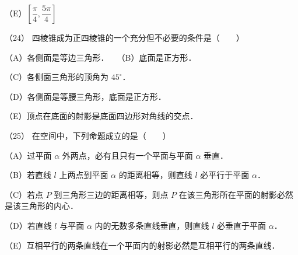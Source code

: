 \begin{question}
（E）$\left[\dfrac\pi4,\dfrac{5\pi}4\right]$

（24） 四棱锥成为正四棱锥的一个充分但不必要的条件是\mbox{（　　）}

（A）各侧面是等边三角形．　　（B）底面是正方形．

（C）各侧面三角形的顶角为 $45^\circ$．

（D）各侧面是等腰三角形，底面是正方形．

（E）顶点在底面的射影是底面四边形对角线的交点．

（25） 在空间中，下列命题成立的是\mbox{（　　）}

（A）过平面 $\alpha$ 外两点，必有且只有一个平面与平面 $\alpha$ 垂直．

（B）若直线 $l$ 上两点到平面 $\alpha$ 的距离相等，则直线 $l$ 必平行于平面 $\alpha$．

（C）若点 $P$ 到三角形三边的距离相等，则点 $P$ 在该三角形所在平面的射影必然是该三角形的内心．

（D）若直线 $l$ 与平面 $\alpha$ 内的无数多条直线垂直，则直线 $l$ 必垂直于平面 $\alpha$．

（E）互相平行的两条直线在一个平面内的射影必然是互相平行的两条直线．

\end{question}
